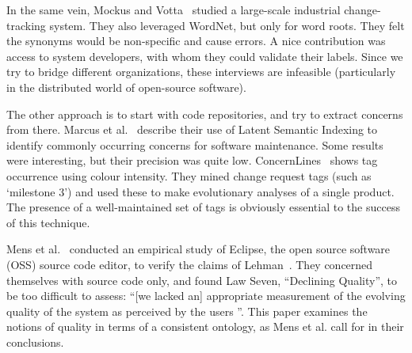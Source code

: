 \documentclass[]{sig-alternate}
\begin{document}
In the same vein, Mockus and Votta~\cite{Mockus00} studied a large-scale industrial change-tracking system. They also leveraged WordNet, but only for word roots. They felt the synonyms would be non-specific and cause errors. A nice contribution was access to system developers, with whom they could validate their labels. Since we try to bridge different organizations, these interviews are infeasible (particularly in the distributed world of open-source software).

The other approach is to start with code repositories, and try to extract concerns from there. Marcus et al.~\cite{marcus04wcre} describe their use of Latent Semantic Indexing to identify commonly occurring concerns for software maintenance. Some results were interesting, but their precision was quite low. ConcernLines~\cite{treude09cl} shows tag occurrence using colour intensity. They mined change request tags (such as `milestone 3') and used these to make evolutionary analyses of a single product. The presence of a well-maintained set of tags is obviously essential to the success of this technique.

Mens et al.~\cite{mens08icsm} conducted an empirical study of Eclipse, the open source software (OSS) source code editor, to verify the claims of Lehman~\cite{lehman97sms}. They concerned themselves with source code only, and found Law Seven, ``Declining Quality'', to be too difficult to assess: ``[we lacked an] appropriate measurement of the evolving quality of the system as perceived by the users \cite[p. 388]{mens08icsm}''. This paper examines the notions of quality in terms of a consistent ontology, as Mens et al. call for in their conclusions.
\end{document}
